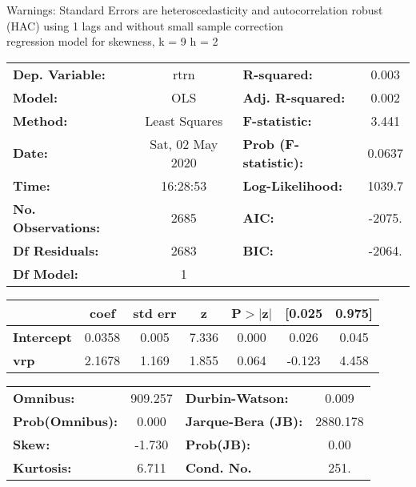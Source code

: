 Warnings: \newline
 [1] Standard Errors are heteroscedasticity and autocorrelation robust (HAC) using 1 lags and without small sample correction\\ 

regression model for skewness, k = 9 h = 2\begin{center}
\begin{tabular}{lclc}
\toprule
\textbf{Dep. Variable:}    &       rtrn       & \textbf{  R-squared:         } &     0.003   \\
\textbf{Model:}            &       OLS        & \textbf{  Adj. R-squared:    } &     0.002   \\
\textbf{Method:}           &  Least Squares   & \textbf{  F-statistic:       } &     3.441   \\
\textbf{Date:}             & Sat, 02 May 2020 & \textbf{  Prob (F-statistic):} &   0.0637    \\
\textbf{Time:}             &     16:28:53     & \textbf{  Log-Likelihood:    } &    1039.7   \\
\textbf{No. Observations:} &        2685      & \textbf{  AIC:               } &    -2075.   \\
\textbf{Df Residuals:}     &        2683      & \textbf{  BIC:               } &    -2064.   \\
\textbf{Df Model:}         &           1      & \textbf{                     } &             \\
\bottomrule
\end{tabular}
\begin{tabular}{lcccccc}
                   & \textbf{coef} & \textbf{std err} & \textbf{z} & \textbf{P$> |$z$|$} & \textbf{[0.025} & \textbf{0.975]}  \\
\midrule
\textbf{Intercept} &       0.0358  &        0.005     &     7.336  &         0.000        &        0.026    &        0.045     \\
\textbf{vrp}       &       2.1678  &        1.169     &     1.855  &         0.064        &       -0.123    &        4.458     \\
\bottomrule
\end{tabular}
\begin{tabular}{lclc}
\textbf{Omnibus:}       & 909.257 & \textbf{  Durbin-Watson:     } &    0.009  \\
\textbf{Prob(Omnibus):} &   0.000 & \textbf{  Jarque-Bera (JB):  } & 2880.178  \\
\textbf{Skew:}          &  -1.730 & \textbf{  Prob(JB):          } &     0.00  \\
\textbf{Kurtosis:}      &   6.711 & \textbf{  Cond. No.          } &     251.  \\
\bottomrule
\end{tabular}
\end{center}

